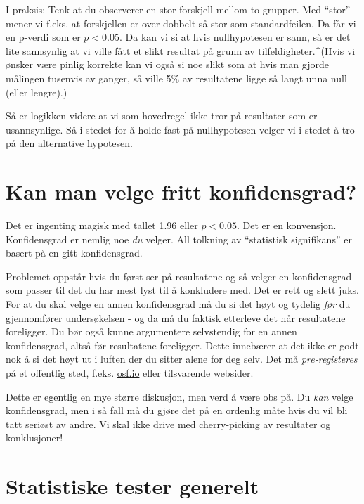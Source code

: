 \documentclass[
  letterpaper,
  DIV=11,
  numbers=noendperiod]{scrreprt}
\theoremstyle{definition}
\theoremstyle{remark}
\begin{document}
I praksis: Tenk at du observerer en stor forskjell mellom to grupper.
Med ``stor'' mener vi f.eks. at forskjellen er over dobbelt så stor som
standardfeilen. Da får vi en p-verdi som er \(p < 0.05\). Da kan vi si
at hvis nullhypotesen er sann, så er det lite sannsynlig at vi ville
fått et slikt resultat på grunn av tilfeldigheter.\^{}(Hvis vi ønsker
være pinlig korrekte kan vi også si noe slikt som at hvis man gjorde
målingen tusenvis av ganger, så ville 5\% av resultatene ligge så langt
unna null (eller lengre).)

Så er logikken videre at vi som hovedregel ikke tror på resultater som
er usannsynlige. Så i stedet for å holde fast på nullhypotesen velger vi
i stedet å tro på den alternative hypotesen.

\hypertarget{kan-man-velge-fritt-konfidensgrad}{%
\section{Kan man velge fritt
konfidensgrad?}\label{kan-man-velge-fritt-konfidensgrad}}

Det er ingenting magisk med tallet 1.96 eller \(p < 0.05\). Det er en
konvensjon. Konfidensgrad er nemlig noe \emph{du} velger. All tolkning
av ``statistisk signifikans'' er basert på en gitt konfidensgrad.

Problemet oppstår hvis du først ser på resultatene og så velger en
konfidensgrad som passer til det du har mest lyst til å konkludere med.
Det er rett og slett juks. For at du skal velge en annen konfidensgrad
må du si det høyt og tydelig \emph{før} du gjennomfører undersøkelsen -
og da må du faktisk etterleve det når resultatene foreligger. Du bør
også kunne argumentere selvstendig for en annen konfidensgrad, altså før
resultatene foreligger. Dette innebærer at det ikke er godt nok å si det
høyt ut i luften der du sitter alene for deg selv. Det må
\emph{pre-registeres} på et offentlig sted, f.eks. \url{osf.io} eller
tilsvarende websider.

Dette er egentlig en mye større diskusjon, men verd å være obs på. Du
\emph{kan} velge konfidensgrad, men i så fall må du gjøre det på en
ordenlig måte hvis du vil bli tatt seriøst av andre. Vi skal ikke drive
med cherry-picking av resultater og konklusjoner!

\hypertarget{statistiske-tester-generelt}{%
\section{Statistiske tester
generelt}\label{statistiske-tester-generelt}}
\end{document}
